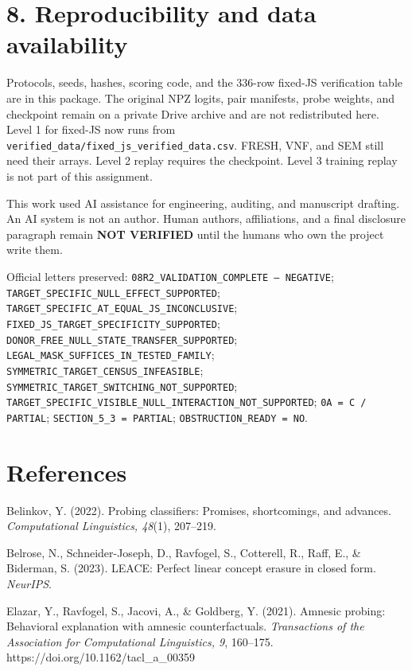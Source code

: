 \documentclass[11pt]{article}
\begin{document}
\section{8. Reproducibility and data availability}

Protocols, seeds, hashes, scoring code, and the 336-row fixed-JS verification table are in this package. The original NPZ logits, pair manifests, probe weights, and checkpoint remain on a private Drive archive and are not redistributed here. Level 1 for fixed-JS now runs from \texttt{verified\_data/fixed\_js\_verified\_data.csv}. FRESH, VNF, and SEM still need their arrays. Level 2 replay requires the checkpoint. Level 3 training replay is not part of this assignment.

This work used AI assistance for engineering, auditing, and manuscript drafting. An AI system is not an author. Human authors, affiliations, and a final disclosure paragraph remain \textbf{NOT VERIFIED} until the humans who own the project write them.

Official letters preserved: \texttt{08R2\_VALIDATION\_COMPLETE --- NEGATIVE}; \texttt{TARGET\_SPECIFIC\_NULL\_EFFECT\_SUPPORTED}; \texttt{TARGET\_SPECIFIC\_AT\_EQUAL\_JS\_INCONCLUSIVE}; \texttt{FIXED\_JS\_TARGET\_SPECIFICITY\_SUPPORTED}; \texttt{DONOR\_FREE\_NULL\_STATE\_TRANSFER\_SUPPORTED}; \texttt{LEGAL\_MASK\_SUFFICES\_IN\_TESTED\_FAMILY}; \texttt{SYMMETRIC\_TARGET\_CENSUS\_INFEASIBLE}; \texttt{SYMMETRIC\_TARGET\_SWITCHING\_NOT\_SUPPORTED}; \texttt{TARGET\_SPECIFIC\_VISIBLE\_NULL\_INTERACTION\_NOT\_SUPPORTED}; \texttt{0A = C / PARTIAL}; \texttt{SECTION\_5\_3 = PARTIAL}; \texttt{OBSTRUCTION\_READY = NO}.

\section{References}

Belinkov, Y. (2022). Probing classifiers: Promises, shortcomings, and advances. \emph{Computational Linguistics, 48}(1), 207--219.

Belrose, N., Schneider-Joseph, D., Ravfogel, S., Cotterell, R., Raff, E., \& Biderman, S. (2023). LEACE: Perfect linear concept erasure in closed form. \emph{NeurIPS}.

Elazar, Y., Ravfogel, S., Jacovi, A., \& Goldberg, Y. (2021). Amnesic probing: Behavioral explanation with amnesic counterfactuals. \emph{Transactions of the Association for Computational Linguistics, 9}, 160--175. https://doi.org/10.1162/tacl\_a\_00359
\end{document}
